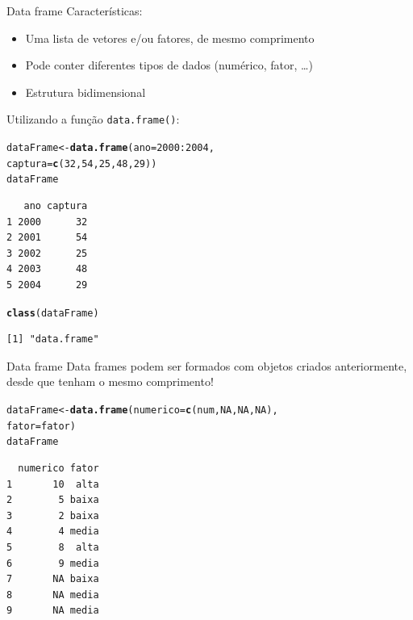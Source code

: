 \documentclass[10pt,handout]{beamer}\usepackage[]{graphicx}\usepackage[]{color}
\makeatletter
\newcommand{\hlnum}[1]{\textcolor[rgb]{0.686,0.059,0.569}{#1}}%
\newcommand{\hlopt}[1]{\textcolor[rgb]{0,0,0}{#1}}%
\newcommand{\hlstd}[1]{\textcolor[rgb]{0.345,0.345,0.345}{#1}}%
\newcommand{\hlkwb}[1]{\textcolor[rgb]{0.69,0.353,0.396}{#1}}%
\newcommand{\hlkwc}[1]{\textcolor[rgb]{0.333,0.667,0.333}{#1}}%
\newcommand{\hlkwd}[1]{\textcolor[rgb]{0.282,0.239,0.545}{\textbf{#1}}}%
\newenvironment{kframe}{%
 \def\at@end@of@kframe{}%
 \ifinner\ifhmode%
  \def\at@end@of@kframe{\end{minipage}}%
  \begin{minipage}{\columnwidth}%
 \fi\fi%
 \def\FrameCommand##1{\hskip\@totalleftmargin \hskip-\fboxsep
 \colorbox{shadecolor}{##1}\hskip-\fboxsep
     \hskip-\linewidth \hskip-\@totalleftmargin \hskip\columnwidth}%
 \MakeFramed {\advance\hsize-\width
   \@totalleftmargin\z@ \linewidth\hsize
   \@setminipage}}%
 {\par\unskip\endMakeFramed%
 \at@end@of@kframe}
\newenvironment{knitrout}{}{} %
\makeatother
\begin{document}
\begin{frame}[fragile]{Data frame}
Características:
\begin{itemize}
\item Uma lista de vetores e/ou fatores, de mesmo comprimento
\item Pode conter diferentes tipos de dados (numérico, fator, \ldots)
\item Estrutura bidimensional
\end{itemize}
Utilizando a função \texttt{data.frame()}:
\begin{knitrout}\small
{}\color{fgcolor}\begin{kframe}
\begin{alltt}
\hlstd{dataFrame} \hlkwb{<-} \hlkwd{data.frame}\hlstd{(}\hlkwc{ano} \hlstd{=} \hlnum{2000}\hlopt{:}\hlnum{2004}\hlstd{,}
                        \hlkwc{captura} \hlstd{=} \hlkwd{c}\hlstd{(}\hlnum{32}\hlstd{,} \hlnum{54}\hlstd{,} \hlnum{25}\hlstd{,} \hlnum{48}\hlstd{,} \hlnum{29}\hlstd{))}
\hlstd{dataFrame}
\end{alltt}
\begin{verbatim}
   ano captura
1 2000      32
2 2001      54
3 2002      25
4 2003      48
5 2004      29
\end{verbatim}
\begin{alltt}
\hlkwd{class}\hlstd{(dataFrame)}
\end{alltt}
\begin{verbatim}
[1] "data.frame"
\end{verbatim}
\end{kframe}
\end{knitrout}

\end{frame}

\begin{frame}[fragile]{Data frame}
Data frames podem ser formados com objetos criados anteriormente, desde
que tenham o mesmo comprimento!
\begin{knitrout}\small
{}\color{fgcolor}\begin{kframe}
\begin{alltt}
\hlstd{dataFrame} \hlkwb{<-} \hlkwd{data.frame}\hlstd{(}\hlkwc{numerico} \hlstd{=} \hlkwd{c}\hlstd{(num,} \hlnum{NA}\hlstd{,} \hlnum{NA}\hlstd{,} \hlnum{NA}\hlstd{),}
                        \hlkwc{fator} \hlstd{= fator)}
\hlstd{dataFrame}
\end{alltt}
\begin{verbatim}
  numerico fator
1       10  alta
2        5 baixa
3        2 baixa
4        4 media
5        8  alta
6        9 media
7       NA baixa
8       NA media
9       NA media
\end{verbatim}
\end{kframe}
\end{knitrout}

\end{frame}
\end{document}
